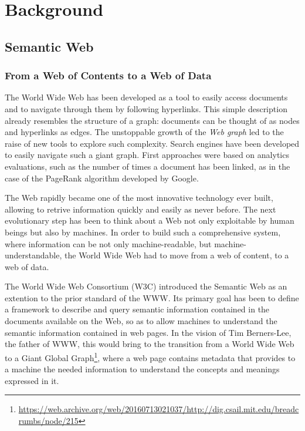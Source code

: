 \documentclass[%
    corpo=13.5pt,
    twoside,
    oldstyle,
    tipotesi=magistrale,
    greek,
    evenboxes
]{toptesi}
\begin{document}
\chapter{Background}

\section{Semantic Web}

\subsection{From a Web of Contents to a Web of Data}

The World Wide Web has been developed as a tool to easily access
documents and to navigate through them by following hyperlinks.
This simple description already resembles the structure of a graph:
documents can be thought of as nodes and hyperlinks as edges.
The unstoppable growth
of the \emph{Web graph} led to the raise of new tools to explore such
complexity. Search engines have been developed to easily navigate such a
giant graph. First approaches were based on analytics evaluations,
such as the number of times a document has been linked, as in the case of the
PageRank \cite{page1999} algorithm developed by Google.
\newline

The Web rapidly became one of the most innovative technology ever built,
allowing to retrive information quickly and easily as never before.
The next evolutionary step has been to think about a Web not only exploitable by
human beings but also by machines. In order to build such a comprehensive
system, where information can be not only machine-readable, but
machine-understandable, the World Wide Web had to move from a web of content, to
a web of data.
\newline

The World Wide Web Consortium (W3C) introduced the Semantic Web as an extention
to the prior standard of the WWW. Its primary goal has been
to define a framework to describe and query semantic information contained
in the documents available on the Web, so as to allow machines to understand
the semantic information contained in web pages. In the vision of Tim
Berners-Lee, the father of WWW, this would bring to the transition from a
World Wide Web to a Giant Global Graph\footnote{\url{https://web.archive.org/web/20160713021037/http://dig.csail.mit.edu/breadcrumbs/node/215}},
where a web page contains metadata that provides to a machine the needed
information to understand the concepts and meanings expressed in it.
\end{document}
